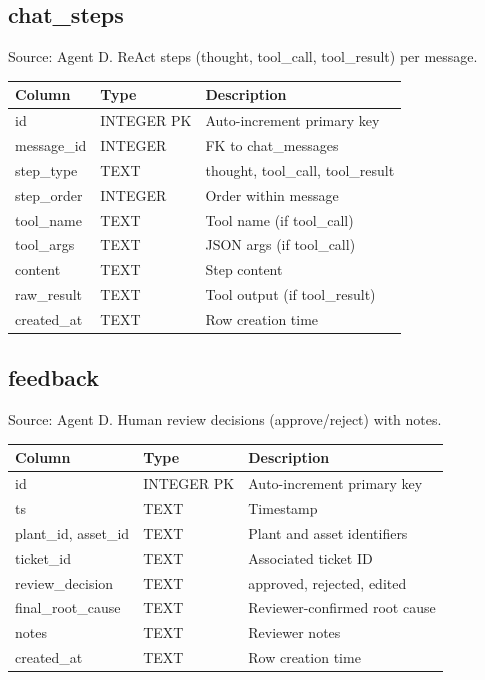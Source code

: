 \documentclass[12pt,letterpaper]{report}
\begin{document}
\subsection*{chat\_steps}
Source: Agent D. ReAct steps (thought, tool\_call, tool\_result) per message.

\begin{tabular}{@{}llp{5.5cm}@{}}
\toprule
\textbf{Column} & \textbf{Type} & \textbf{Description} \\
\midrule
id & INTEGER PK & Auto-increment primary key \\
message\_id & INTEGER & FK to chat\_messages \\
step\_type & TEXT & thought, tool\_call, tool\_result \\
step\_order & INTEGER & Order within message \\
tool\_name & TEXT & Tool name (if tool\_call) \\
tool\_args & TEXT & JSON args (if tool\_call) \\
content & TEXT & Step content \\
raw\_result & TEXT & Tool output (if tool\_result) \\
created\_at & TEXT & Row creation time \\
\bottomrule
\end{tabular}

\subsection*{feedback}
Source: Agent D. Human review decisions (approve/reject) with notes.

\begin{tabular}{@{}llp{5.5cm}@{}}
\toprule
\textbf{Column} & \textbf{Type} & \textbf{Description} \\
\midrule
id & INTEGER PK & Auto-increment primary key \\
ts & TEXT & Timestamp \\
plant\_id, asset\_id & TEXT & Plant and asset identifiers \\
ticket\_id & TEXT & Associated ticket ID \\
review\_decision & TEXT & approved, rejected, edited \\
final\_root\_cause & TEXT & Reviewer-confirmed root cause \\
notes & TEXT & Reviewer notes \\
created\_at & TEXT & Row creation time \\
\bottomrule
\end{tabular}
\end{document}
